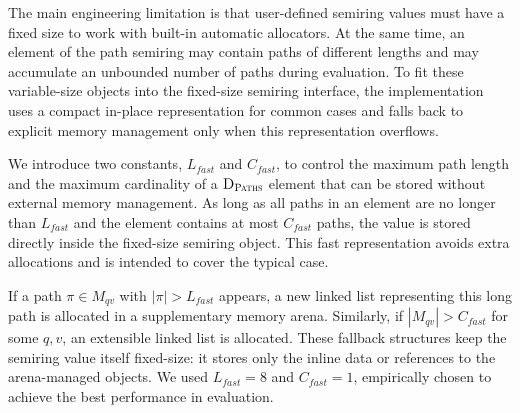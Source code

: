 %
%

The main engineering limitation is that \ssgrb user-defined semiring values must have a fixed size to work with built-in automatic allocators.
At the same time, an element of the path semiring may contain paths of different lengths and may accumulate an unbounded number of paths during evaluation.
To fit these variable-size objects into the fixed-size semiring interface, the implementation uses a compact in-place representation for common cases and falls back to explicit memory management only when this representation overflows.

We introduce two constants, $L_{fast}$ and $C_{fast}$, to control the maximum path length and the maximum cardinality of a $\textsc{D}_{\textsc{Paths}}$ element that can be stored without external memory management.
As long as all paths in an element are no longer than $L_{fast}$ and the element contains at most $C_{fast}$ paths, the value is stored directly inside the fixed-size semiring object.
This fast representation avoids extra allocations and is intended to cover the typical case.

If a path $\pi \in M_{qv}$ with $|\pi| > L_{fast}$ appears, a new linked list representing this long path is allocated in a supplementary memory arena.
Similarly, if $|M_{qv}| > C_{fast}$ for some $q, v$, an extensible linked list is allocated.
These fallback structures keep the semiring value itself fixed-size: it stores only the inline data or references to the arena-managed objects.
We used $L_{fast} = 8$ and $C_{fast} = 1$, empirically chosen to achieve the best performance in evaluation.

